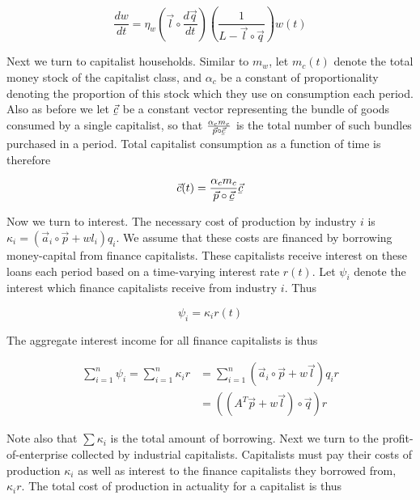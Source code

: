 \documentclass{article}
\newcommand{\ubar}[1]{\underaccent{\bar}{#1}}
\theoremstyle{definition}
\begin{document}
\begin{equation}\label{wage-rate}
    \frac{dw}{dt} = \eta_w \left(\vec{l}\circ \frac{d\vec{q}}{dt}\right)\left(\frac{1}{L-\vec{l}\circ\vec{q}}\right)w(t)
\end{equation}

Next we turn to capitalist households. Similar to $m_w$, let $m_c(t)$ denote the total money stock of the capitalist class, and $\alpha_c$ be a constant of proportionality denoting the proportion of this stock which they use on consumption each period. Also as before we let $\vec{\ubar{c}}$ be a constant vector representing the bundle of goods consumed by a single capitalist, so that $\frac{\alpha_cm_c}{\vec{p}\circ\vec{\ubar{c}}}$ is the total number of such bundles purchased in a period. Total capitalist consumption as a function of time is therefore 

\begin{equation}
    \vec{c}(t) = \frac{\alpha_cm_c}{\vec{p}\circ\vec{\ubar{c}}}\vec{\ubar{c}}
\end{equation}

Now we turn to interest. The necessary cost of production by industry $i$ is $\kappa_i = (\vec{a}_i\circ\vec{p}+wl_i)q_i$. We assume that these costs are financed by borrowing money-capital from finance capitalists. These capitalists receive interest on these loans each period based on a time-varying interest rate $r(t)$. Let $\psi_i$ denote the interest which finance capitalists receive from industry $i$. Thus

\begin{equation}
    \psi_i = \kappa_i r(t)
\end{equation}

The aggregate interest income for all finance capitalists is thus

\begin{align}
    \sum_{i=1}^n \psi_i = \sum_{i=1}^n\kappa_i r &= \sum_{i=1}^n (\vec{a}_i\circ\vec{p}+w\vec{l})q_ir \\
                                                 &= ((A^T\vec{p}+w\vec{l})\circ\vec{q})r
\end{align}

Note also that $\sum \kappa_i$ is the total amount of borrowing. Next we turn to the profit-of-enterprise collected by industrial capitalists. Capitalists must pay their costs of production $\kappa_i$ as well as interest to the finance capitalists they borrowed from, $\kappa_ir$. The total cost of production in actuality for a capitalist is thus 
\end{document}

